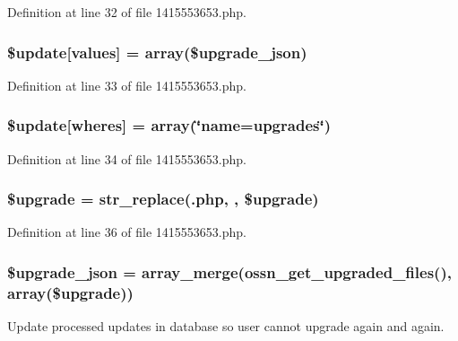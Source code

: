 Definition at line 32 of file 1415553653.\+php.

\subsubsection[{\texorpdfstring{\$update}{$update}}]{\setlength{\rightskip}{0pt plus 5cm}\${\bf update}\mbox{[}\textquotesingle{}values\textquotesingle{}\mbox{]} = array(\$upgrade\+\_\+json)}\hypertarget{1415553653_8php_ac82a75b4c6df37380ff77c88f041785e}{}\label{1415553653_8php_ac82a75b4c6df37380ff77c88f041785e}


Definition at line 33 of file 1415553653.\+php.

\subsubsection[{\texorpdfstring{\$update}{$update}}]{\setlength{\rightskip}{0pt plus 5cm}\${\bf update}\mbox{[}\textquotesingle{}wheres\textquotesingle{}\mbox{]} = array(\char`\"{}name=\textquotesingle{}upgrades\textquotesingle{}\char`\"{})}\hypertarget{1415553653_8php_aacde4479a904b32d0f24dea4e01f148c}{}\label{1415553653_8php_aacde4479a904b32d0f24dea4e01f148c}


Definition at line 34 of file 1415553653.\+php.

\subsubsection[{\texorpdfstring{\$upgrade}{$upgrade}}]{\setlength{\rightskip}{0pt plus 5cm}\$upgrade = str\+\_\+replace(\textquotesingle{}.php\textquotesingle{}, \textquotesingle{}\textquotesingle{}, \$upgrade)}\hypertarget{1415553653_8php_a9084097ce600d3cc7a79a20ecaea9906}{}\label{1415553653_8php_a9084097ce600d3cc7a79a20ecaea9906}


Definition at line 36 of file 1415553653.\+php.

\subsubsection[{\texorpdfstring{\$upgrade\+\_\+json}{$upgrade_json}}]{\setlength{\rightskip}{0pt plus 5cm}\$upgrade\+\_\+json = array\+\_\+merge({\bf ossn\+\_\+get\+\_\+upgraded\+\_\+files}(), array(\$upgrade))}\hypertarget{1415553653_8php_a512525d0f5eb608ac72ca7b85e5fbf65}{}\label{1415553653_8php_a512525d0f5eb608ac72ca7b85e5fbf65}
Update processed updates in database so user cannot upgrade again and again.

